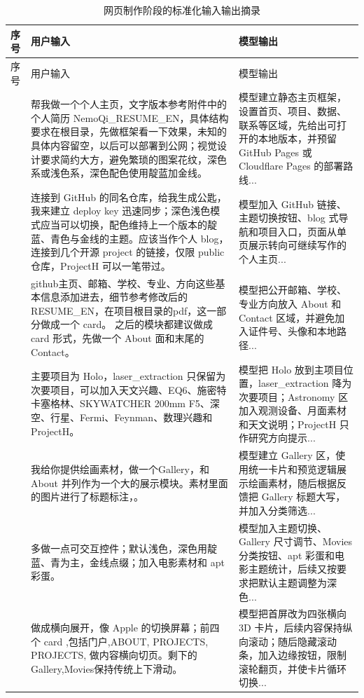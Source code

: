 \documentclass[UTF8,a4paper]{ctexart}
\renewcommand{\arraystretch}{1.2}
\begin{document}
\begingroup
\small
\setlength{\tabcolsep}{4pt}
\renewcommand{\arraystretch}{1.18}
\begin{longtable}{@{}>{\raggedright\arraybackslash}p{}>{\raggedright\arraybackslash}p{}>{\raggedright\arraybackslash}p{}@{}}
\caption{网页制作阶段的标准化输入输出摘录}\label{tab:vibe-io}\\
\toprule
序号 & 用户输入 & 模型输出 \\
\midrule
\endfirsthead
\toprule
序号 & 用户输入 & 模型输出 \\
\midrule
\endhead
1 & 帮我做一个个人主页，文字版本参考附件中的个人简历 NemoQi\_RESUME\_EN，具体结构要求在根目录，先做框架看一下效果，未知的具体内容留空，以后可以部署到公网；视觉设计要求简约大方，避免繁琐的图案花纹，深色系或浅色系，深色配色使用靛蓝加金线。 & 模型建立静态主页框架，设置首页、项目、数据、联系等区域，先给出可打开的本地版本，并预留 GitHub Pages 或 Cloudflare Pages 的部署路线... \\
2 & 连接到 GitHub 的同名仓库，给我生成公匙，我来建立 deploy key 迅速同步；深色浅色模式应当可以切换，配色维持上一个版本的靛蓝、青色与金线的主题。应该当作个人 blog，连接到几个开源 project 的链接，仅限 public 仓库，ProjectH 可以一笔带过。 & 模型加入 GitHub 链接、主题切换按钮、blog 式导航和项目入口，页面从单页展示转向可继续写作的个人主页... \\
3 & github主页、邮箱、学校、专业、方向这些基本信息添加进去，细节参考修改后的RESUME\_EN，在项目根目录的pdf，这一部分做成一个 card。 之后的模块都建议做成 card 形式，先做一个 About 面和末尾的 Contact。 & 模型把公开邮箱、学校、专业方向放入 About 和 Contact 区域，并避免加入证件号、头像和本地路径... \\
4 & 主要项目为 Holo，laser\_extraction 只保留为次要项目，可以加入天文兴趣、EQ6、施密特卡塞格林、SKYWATCHER 200mm F5、深空、行星、Fermi、Feynman、数理兴趣和 ProjectH。 & 模型把 Holo 放到主项目位置，laser\_extraction 降为次要项目；Astronomy 区加入观测设备、月面素材和天文说明；ProjectH 只作研究方向提示... \\
5 & 我给你提供绘画素材，做一个Gallery，和 About 并列作为一个大的展示模块。素材里面的图片进行了标题标注，。 & 模型建立 Gallery 区，使用统一卡片和预览逻辑展示绘画素材，随后根据反馈把 Gallery 标题大写，并加入分类筛选... \\
6 & 多做一点可交互控件；默认浅色，深色用靛蓝、青为主，金线点缀；加入电影素材和 apt 彩蛋。 & 模型加入主题切换、Gallery 尺寸调节、Movies 分类按钮、apt 彩蛋和电影主题统计，后续又按要求把默认主题调整为深色... \\
7 & 做成横向展开，像 Apple 的切换屏幕；前四个 card ,包括门户,ABOUT, PROJECTS, PROJECTS, 做内容横向切页。剩下的Gallery,Movies保持传统上下滑动。 & 模型把首屏改为四张横向 3D 卡片，后续内容保持纵向滚动；随后隐藏滚动条，加入边缘按钮，限制滚轮翻页，并使卡片循环切换... \\

\end{longtable}
\end{document}
